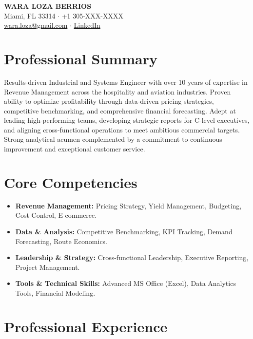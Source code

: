 \documentclass[11pt,a4paper,sans]{article}
\begin{document}
\begin{center}
    {\Huge \textbf{WARA LOZA BERRIOS}} \\ \vspace{4pt}
    Miami, FL 33314 $\cdot$ +1 305-XXX-XXXX \\ %
    \href{mailto:wara.loza@gmail.com}{wara.loza@gmail.com} $\cdot$ 
    \href{https://www.linkedin.com/in/wara-loza-berrios-4293a9166/}{LinkedIn}
\end{center}

\section{Professional Summary}
Results-driven Industrial and Systems Engineer with over 10 years of expertise in Revenue Management across the hospitality and aviation industries. Proven ability to optimize profitability through data-driven pricing strategies, competitive benchmarking, and comprehensive financial forecasting. Adept at leading high-performing teams, developing strategic reports for C-level executives, and aligning cross-functional operations to meet ambitious commercial targets. Strong analytical acumen complemented by a commitment to continuous improvement and exceptional customer service.

\section{Core Competencies}
\begin{itemize}
    \item \textbf{Revenue Management:} Pricing Strategy, Yield Management, Budgeting, Cost Control, E-commerce.
    \item \textbf{Data \& Analysis:} Competitive Benchmarking, KPI Tracking, Demand Forecasting, Route Economics.
    \item \textbf{Leadership \& Strategy:} Cross-functional Leadership, Executive Reporting, Project Management.
    \item \textbf{Tools \& Technical Skills:} Advanced MS Office (Excel), Data Analytics Tools, Financial Modeling.
\end{itemize}

\section{Professional Experience}
\end{document}
